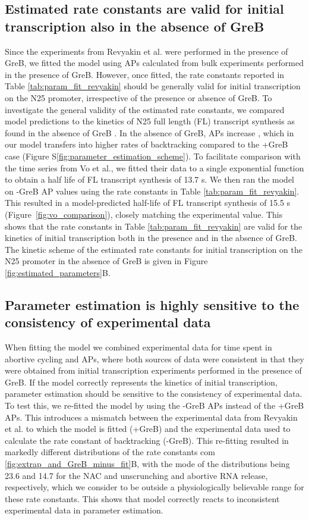 \subsection{Estimated rate constants are valid for initial transcription also
in the absence of GreB}
Since the experiments from Revyakin et al. were performed in the presence of
GreB, we fitted the model using APs calculated from bulk experiments performed
in the presence of GreB. However, once fitted, the rate constants reported in
Table \ref{tab:param_fit_revyakin} should be generally valid for initial
transcription on the N25 promoter, irrespective of the presence or absence of
GreB. To investigate the general validity of the estimated rate constants, we
compared model predictions to the kinetics of N25 full length (FL) transcript
synthesis as found in the absence of GreB \cite{vo_vitro_2003-1}. In the
absence of GreB, APs increase \cite{hsu_initial_2006}, which in our model
transfers into higher rates of backtracking compared to the +GreB case (Figure
S\ref{fig:parameter_estimation_scheme}). To facilitate comparison with the
time series from Vo et al., we fitted their data to a single exponential
function to obtain a half life of FL transcript synthesis of 13.7 s. We then
ran the model on -GreB AP values using the rate constants in Table
\ref{tab:param_fit_revyakin}. This resulted in a model-predicted half-life of
FL transcript synthesis of 15.5 s (Figure~\ref{fig:vo_comparison}), closely
matching the experimental value. This shows that the rate constants in Table
\ref{tab:param_fit_revyakin} are valid for the kinetics of initial
transcription both in the presence and in the absence of GreB. The kinetic
scheme of the estimated rate constants for initial transcription on the N25
promoter in the absence of GreB is given in Figure
\ref{fig:estimated_parameters}B.

\subsection{Parameter estimation is highly sensitive to the consistency of experimental data}
When fitting the model we combined experimental data for time spent in
abortive cycling and APs, where both sources of data were consistent in that
they were obtained from initial transcription experiments performed in the
presence of GreB. If the model correctly represents the kinetics of initial
transcription, parameter estimation should be sensitive to the consistency of
experimental data. To test this, we re-fitted the model by using the -GreB APs
instead of the +GreB APs. This introduces a mismatch between the experimental
data from Revyakin et al. to which the model is fitted (+GreB) and the
experimental data used to calculate the rate constant of backtracking (-GreB).
This re-fitting resulted in markedly different distributions of the rate
constants com \ref{fig:extrap_and_GreB_minus_fit}B, with the mode of the
distributions being 23.6 and 14.7 for the NAC and unscrunching and abortive
RNA release, respectively, which we consider to be outside a physiologically
believable range for these rate constants. This shows that model correctly
reacts to inconsistent experimental data in parameter estimation.

